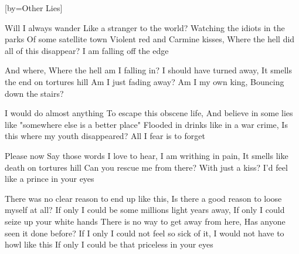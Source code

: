 [by={Other Lies}]


  \chordsoff
  \beginverse
  Will I always wander
  Like a stranger to the world?
  Watching the idiots in the parks
  Of some satellite town
  Violent red and Carmine kisses,
  Where the hell did all of this disappear?
  I am falling off the edge
  \endverse
  
  \beginchorus
  And where,
  Where the hell am I falling in?
  I should have turned away,
  It smells the end on tortures hill
  Am I just fading away?
  Am I my own king,
  Bouncing down the stairs?
  \endchorus
  
  
  \beginverse
  I would do almost anything
  To escape this obscene life,
  And believe in some lies like
  "somewhere else is a better place"
  Flooded in drinks like in a war crime,
  Is this where my youth disappeared?
  All I fear is to forget
  \endverse

  \beginchorus
  Please now
  Say those words I love to hear,
  I am writhing in pain,
  It smells like death on tortures hill
  Can you rescue me from there?
  With just a kiss?
  I'd feel like a prince in your eyes
  \endchorus

  \beginverse
  
  There was no clear reason to end up like this,
  Is there a good reason to loose myself at all?
  If only I could be some millions light years away,
  If only I could seize up your white hands
  There is no way to get away from here,
  Has anyone seen it done before?
  If I only I could not feel so sick of it,
  I would not have to howl like this
  If only I could be that priceless in your eyes  
  \endverse

  
\endsong

